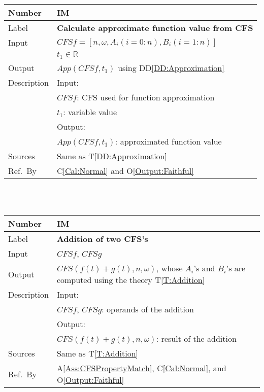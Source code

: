 \documentclass[12pt]{article}
\newcommand{\colAwidth}{0.13\textwidth}
\newcommand{\colBwidth}{0.82\textwidth}
\newcommand{\ddref}[1]{DD\ref{#1}}
\newcommand{\tref}[1]{T\ref{#1}}
\newcommand{\aref}[1]{A\ref{#1}}
\newcommand{\calref}[1]{C\ref{#1}}
\newcommand{\oref}[1]{O\ref{#1}}
\newcounter{instnum} %
\begin{document}
\noindent
\begin{minipage}{\textwidth}
	\renewcommand*{\arraystretch}{1.5}
	\begin{tabular}{| p{\colAwidth} | p{\colBwidth}|}
		\hline
		\rowcolor[gray]{0.9}
		Number& IM{instnum}\theinstnum 
		\label{IM:Approximation}\\
		\hline
		Label& \bf Calculate approximate function value from CFS\\
		\hline
		Input& $\mathit{CFSf}=[n, \omega, A_i(i=0:n), B_i(i=1:n)]$\\
		&$t_1\in\mathbb{R}$\\
		\hline
		Output& $\mathit{App}(\mathit{CFSf}, t_1)$ using \ddref{DD:Approximation}\\
		\hline
		Description&Input:\\
		&$CFSf$: CFS used for function approximation\\
		& $t_1$: variable value\\
		&Output:\\
		&$\mathit{App}(\mathit{CFSf}, t_1)$: approximated function value\\ 
		\hline
		Sources&Same as \tref{DD:Approximation}		\\
		\hline
		Ref.\ By & 
		\calref{Cal:Normal} and
		\oref{Output:Faithful}\\
		\hline
	\end{tabular}
\end{minipage}\\
~\newline


\noindent
\begin{minipage}{\textwidth}
	\renewcommand*{\arraystretch}{1.5}
	\begin{tabular}{| p{\colAwidth} | p{\colBwidth}|}
		\hline
		\rowcolor[gray]{0.9}
		Number& IM{instnum}\theinstnum 
		\label{IM:Addition}\\
		\hline
		Label& \bf Addition of two CFS's \\
		\hline
		Input& $\mathit{CFSf}$, $\mathit{CFSg}$\\
		\hline
		Output& $\mathit{CFS}(f(t)+g(t), n, \omega)$, whose $A_i$'s 
		and $B_i$'s are computed using the theory \tref{T:Addition}\\
		\hline
		Description&Input:\\
		&$\mathit{CFSf}$, $\mathit{CFSg}$: operands of the addition\\
		&Output:\\
		& $\mathit{CFS}(f(t)+g(t), n, \omega)$: result of the addition\\
		\hline
		Sources&Same as \tref{T:Addition}		\\
		\hline
		Ref.\ By & \aref{Ass:CFSPropertyMatch}, \calref{Cal:Normal}, 
		and \oref{Output:Faithful}\\
		\hline
	\end{tabular}
\end{minipage}\\
~\newline
\end{document}
